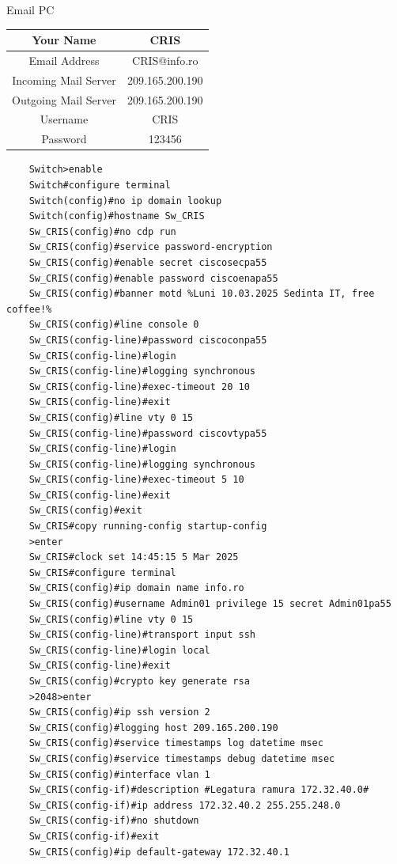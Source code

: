 \documentclass{article}
\begin{document}
\begin{center}
    Email PC
\end{center}
\begin{center}
    \begin{tabular}{|c|c|}\hline
         Your Name & CRIS  \\ \hline 
         Email Address & CRIS@info.ro  \\ \hline
         Incoming Mail Server & 209.165.200.190 \\ \hline
         Outgoing Mail Server & 209.165.200.190 \\ \hline
         Username & CRIS \\ \hline
         Password & 123456 \\ \hline

    \end{tabular}
\end{center}
\newpage
\begin{verbatim}
    Switch>enable
    Switch#configure terminal
    Switch(config)#no ip domain lookup
    Switch(config)#hostname Sw_CRIS
    Sw_CRIS(config)#no cdp run
    Sw_CRIS(config)#service password-encryption
    Sw_CRIS(config)#enable secret ciscosecpa55
    Sw_CRIS(config)#enable password ciscoenapa55
    Sw_CRIS(config)#banner motd %Luni 10.03.2025 Sedinta IT, free coffee!%
    Sw_CRIS(config)#line console 0
    Sw_CRIS(config-line)#password ciscoconpa55
    Sw_CRIS(config-line)#login
    Sw_CRIS(config-line)#logging synchronous
    Sw_CRIS(config-line)#exec-timeout 20 10
    Sw_CRIS(config-line)#exit
    Sw_CRIS(config)#line vty 0 15
    Sw_CRIS(config-line)#password ciscovtypa55
    Sw_CRIS(config-line)#login
    Sw_CRIS(config-line)#logging synchronous
    Sw_CRIS(config-line)#exec-timeout 5 10
    Sw_CRIS(config-line)#exit
    Sw_CRIS(config)#exit 
    Sw_CRIS#copy running-config startup-config
    >enter
    Sw_CRIS#clock set 14:45:15 5 Mar 2025
    Sw_CRIS#configure terminal
    Sw_CRIS(config)#ip domain name info.ro
    Sw_CRIS(config)#username Admin01 privilege 15 secret Admin01pa55
    Sw_CRIS(config)#line vty 0 15
    Sw_CRIS(config-line)#transport input ssh
    Sw_CRIS(config-line)#login local
    Sw_CRIS(config-line)#exit
    Sw_CRIS(config)#crypto key generate rsa
    >2048>enter
    Sw_CRIS(config)#ip ssh version 2
    Sw_CRIS(config)#logging host 209.165.200.190
    Sw_CRIS(config)#service timestamps log datetime msec
    Sw_CRIS(config)#service timestamps debug datetime msec
    Sw_CRIS(config)#interface vlan 1
    Sw_CRIS(config-if)#description #Legatura ramura 172.32.40.0#
    Sw_CRIS(config-if)#ip address 172.32.40.2 255.255.248.0
    Sw_CRIS(config-if)#no shutdown
    Sw_CRIS(config-if)#exit
    Sw_CRIS(config)#ip default-gateway 172.32.40.1
\end{verbatim}
\end{document}
